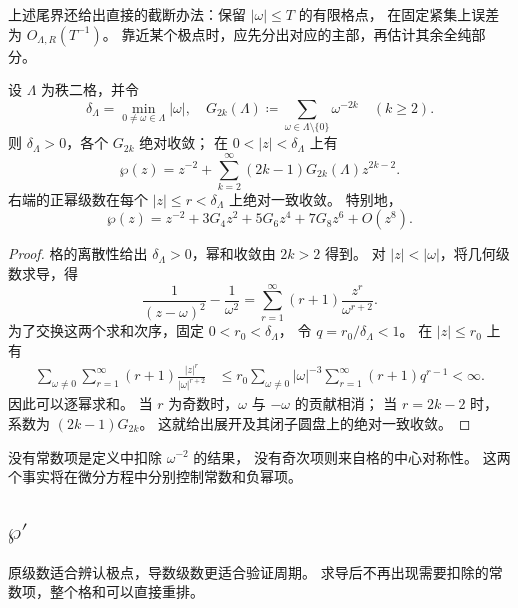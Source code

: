 上述尾界还给出直接的截断办法：保留 \(|\omega|\le T\) 的有限格点，
在固定紧集上误差为 \(O_{\Lambda,R}(T^{-1})\)。
靠近某个极点时，应先分出对应的主部，再估计其余全纯部分。

\begin{proposition}[Laurent 系数]\label{b3:prop:22-wp-laurent}
设 \(\Lambda\) 为秩二格，并令
\[
 \delta_\Lambda=\min_{0\ne\omega\in\Lambda}|\omega|,\quad
 G_{2k}(\Lambda)\coloneqq\sum_{\omega\in\Lambda\setminus\{0\}}\omega^{-2k}
 \quad(k\ge2).
\]
则 \(\delta_\Lambda>0\)，各个 \(G_{2k}\) 绝对收敛；
在 \(0<|z|<\delta_\Lambda\) 上有
\[
 \wp(z)=z^{-2}+\sum_{k=2}^\infty(2k-1)G_{2k}(\Lambda)z^{2k-2}.
\]
右端的正幂级数在每个 \(|z|\le r<\delta_\Lambda\) 上绝对一致收敛。
特别地，
\[
 \wp(z)=z^{-2}+3G_4z^2+5G_6z^4+7G_8z^6+O(z^8).
\]
\end{proposition}
\begin{proof}
格的离散性给出 \(\delta_\Lambda>0\)，幂和收敛由 \(2k>2\) 得到。
对 \(|z|<|\omega|\)，将几何级数求导，得
\[
 \frac1{(z-\omega)^2}-\frac1{\omega^2}
 =\sum_{r=1}^\infty(r+1)\frac{z^r}{\omega^{r+2}}.
\]
为了交换这两个求和次序，固定 \(0<r_0<\delta_\Lambda\)，
令 \(q=r_0/\delta_\Lambda<1\)。
在 \(|z|\le r_0\) 上有
\[
 \begin{aligned}
 \sum_{\omega\ne0}\sum_{r=1}^\infty
       (r+1)\frac{|z|^r}{|\omega|^{r+2}}
 &\le r_0\sum_{\omega\ne0}|\omega|^{-3}
       \sum_{r=1}^\infty(r+1)q^{r-1}<\infty.
 \end{aligned}
\]
因此可以逐幂求和。
当 \(r\) 为奇数时，\(\omega\) 与 \(-\omega\) 的贡献相消；
当 \(r=2k-2\) 时，系数为 \((2k-1)G_{2k}\)。
这就给出展开及其闭子圆盘上的绝对一致收敛。
\end{proof}

没有常数项是定义中扣除 \(\omega^{-2}\) 的结果，
没有奇次项则来自格的中心对称性。
这两个事实将在微分方程中分别控制常数和负幂项。

\subsection{\texorpdfstring{\(\wp'\)}{\AnalysisPdfWeierstrassP'}}
\label{b3:subsec:220302}

原级数适合辨认极点，导数级数更适合验证周期。
求导后不再出现需要扣除的常数项，整个格和可以直接重排。

